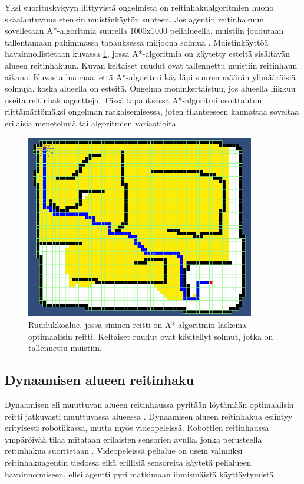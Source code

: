 \documentclass[utf8]{gradu3}
\begin{document}
Yksi suorituskykyyn liittyvistä ongelmista on reitinhakualgoritmien huono skaalautuvuus etenkin muistinkäytön suhteen. Jos agentin reitinhakuun sovelletaan A*-algoritmia suurella 1000x1000 pelialueella, muistiin joudutaan tallentamaan pahimmassa tapauksessa miljoona solmua \parencite{cui2011based,duchovn2014path}. Muistinkäyttöä havainnollistetaan kuvassa \ref{astarmemory}, jossa A*-algoritmia on käytetty esteitä sisältävän alueen reitinhakuun. Kuvan keltaiset ruudut ovat tallennettu muistiin reitinhaun aikana. Kuvasta huomaa, että A*-algoritmi käy läpi suuren määrän ylimääräisiä solmuja, koska alueella on esteitä. Ongelma moninkertaistuu, jos alueella liikkuu useita reitinhakuagentteja. Tässä tapauksessa A*-algoritmi osoittautuu riittämättömäksi ongelman ratkaisemisessa, joten tilanteeseen kannattaa soveltaa erilaisia menetelmiä tai algoritmien variaatioita.

\begin{figure}[h]
\centering
\includegraphics[width=10cm]{a_star_memory.png}
\caption{Ruudukkoalue, jossa sininen reitti on A*-algoritmin laskema optimaalisin reitti. Keltaiset ruudut ovat käsitellyt solmut, jotka on tallennettu muistiin.}
\label{astarmemory}
\end{figure}

\subsection{Dynaamisen alueen reitinhaku}

Dynaamisen eli muuttuvan alueen reitinhaussa pyritään löytämään optimaalisin reitti jatkuvasti muuttuvassa alueessa \parencite{lawande2022systematic}. Dynaamisen alueen reitinhakua esiintyy erityisesti robotiikassa, mutta myös videopeleissä. Robottien reitinhaussa ympäröivää tilaa mitataan erilaisten sensorien avulla, jonka perusteella reitinhakua suoritetaan \parencite{rahmani2022towards}. Videopeleissä pelialue on usein valmiiksi reitinhakuagentin tiedossa eikä erillisiä sensoreita käytetä pelialueen havainnoimiseen, ellei agentti pyri matkimaan ihmismäistä käyttäytymistä.
\end{document}
